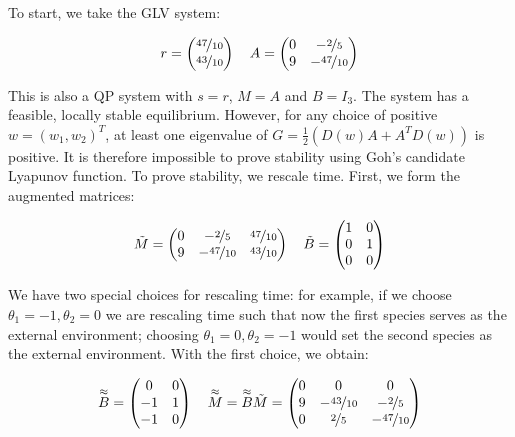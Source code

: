 \documentclass{article}
\begin{document}
To start, we take the GLV system:

\begin{equation}
r = \begin{pmatrix}
\nicefrac{47}{10}\\
\nicefrac{43}{10}
\end{pmatrix} \quad
A = \begin{pmatrix}
0 & -\nicefrac{2}{5}\\
9 & -\nicefrac{47}{10}
\end{pmatrix}
\end{equation}

This is also a QP system with \(s = r\), \(M = A\) and \(B = I_3\). The
system has a feasible, locally stable equilibrium. However, for any
choice of positive \(w = (w_1, w_2)^T\), at least one eigenvalue of
\(G = \frac{1}{2}(D(w) A + A^T D(w))\) is positive. It is therefore
impossible to prove stability using Goh's candidate Lyapunov function.
To prove stability, we rescale time. First, we form the augmented
matrices:

\begin{equation}
\tilde{M} = \begin{pmatrix}
0 & -\nicefrac{2}{5} & \nicefrac{47}{10}\\
9 & -\nicefrac{47}{10} & \nicefrac{43}{10}
\end{pmatrix}
\quad \tilde{B} = \begin{pmatrix}
1 & 0 \\
0 & 1 \\
0 & 0 
\end{pmatrix}
\end{equation}

We have two special choices for rescaling time: for example, if we
choose \(\theta_1 = -1, \theta_2 = 0\) we are rescaling time such that
now the first species serves as the external environment; choosing
\(\theta_1 = 0, \theta_2 = -1\) would set the second species as the
external environment. With the first choice, we obtain:

\begin{equation}
\overset{\approx}{B} = \begin{pmatrix}
0 & 0\\
-1 & 1\\
-1 & 0
\end{pmatrix}\quad \overset{\approx}{M} = \overset{\approx}{B} \tilde{M} = \begin{pmatrix}
0 & 0 & 0\\
9 & -\nicefrac{43}{10} & -\nicefrac{2}{5}\\
0 & \nicefrac{2}{5} & -\nicefrac{47}{10}\\
\end{pmatrix}
\end{equation}
\end{document}
